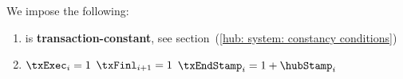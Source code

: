 We impose the following:
\begin{enumerate}
	\item \txEndStamp{} is \textbf{transaction-constant}, see section~(\ref{hub: system: constancy conditions})
	\item \If $\txExec_{i} = 1$ \et $\txFinl_{i + 1} = 1$ \Then $\txEndStamp_{i} = 1 + \hubStamp_{i}$
\end{enumerate}
